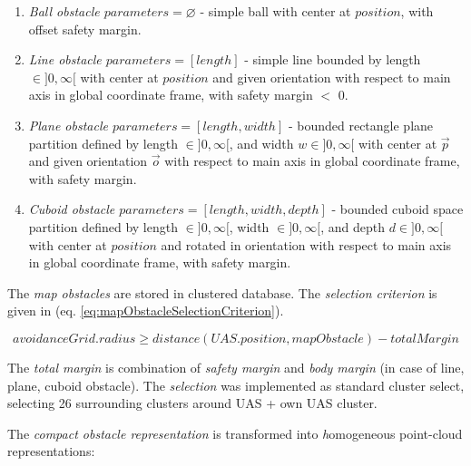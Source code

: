 \begin{enumerate}
    \item\emph{Ball obstacle $parameters=\varnothing$} - simple ball with center at $position$, with offset safety margin.
    
    \item\emph{Line obstacle $parameters=[length]$} - simple line bounded by length $\in]0,\infty[$ with center at $position$ and given orientation with respect to main axis in global coordinate frame, with safety margin $<$ 0.
    
    \item\emph{Plane obstacle $parameters=[length,width]$} - bounded rectangle plane partition defined by length $\in]0,\infty[$, and width $w\in]0,\infty[$ with center at $\vec{p}$ and given orientation $\vec{o}$ with respect to main axis in global coordinate frame, with safety margin.
    
    \item\emph{Cuboid obstacle $parameters=[length,width,depth]$} - bounded cuboid space partition defined by length $\in]0,\infty[$, width $\in]0,\infty[$, and depth $d\in]0,\infty[$ with center at $position$ and rotated in orientation with respect to main axis in global coordinate frame, with safety margin.
\end{enumerate}

\noindent The \emph{map obstacles} are stored in clustered database. The \emph{selection criterion} is given in (eq. \ref{eq:mapObstacleSelectionCriterion}).

\begin{equation}\label{eq:mapObstacleSelectionCriterion}
    avoidance Grid.radius \ge distance(UAS.position,map Obstacle) - total Margin
\end{equation}

\noindent The \emph{total margin} is combination of \emph{safety margin} and \emph{body margin} (in case of line, plane, cuboid obstacle). The \emph{selection} was implemented as standard cluster select, selecting 26  surrounding clusters around UAS + own UAS cluster.

The \emph{compact obstacle representation} is transformed into \emph homogeneous point-cloud representations:

